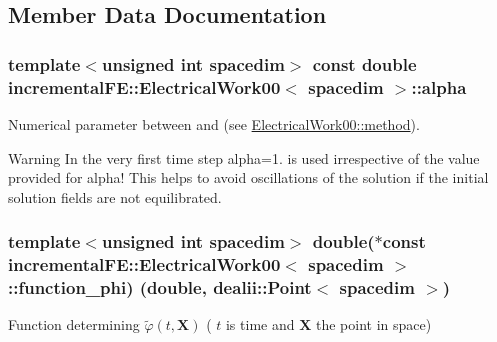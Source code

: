 \subsection{Member Data Documentation}
\subsubsection[{\texorpdfstring{alpha}{alpha}}]{\setlength{\rightskip}{0pt plus 5cm}template$<$unsigned int spacedim$>$ const double {\bf incremental\+F\+E\+::\+Electrical\+Work00}$<$ spacedim $>$\+::alpha\hspace{0.3cm}{\ttfamily [private]}}\hypertarget{classincremental_f_e_1_1_electrical_work00_a932398e0ec8ba1599cbb6cb1cdb0bdbc}{}\label{classincremental_f_e_1_1_electrical_work00_a932398e0ec8ba1599cbb6cb1cdb0bdbc}
Numerical parameter between {} and {} (see \hyperlink{classincremental_f_e_1_1_electrical_work00_a6730746f75d7d3ebae632da3e7fd68d5}{Electrical\+Work00\+::method}).

\begin{DoxyWarning}{Warning}
In the very first time step {\ttfamily alpha=1.} is used irrespective of the value provided for {\ttfamily alpha!} This helps to avoid oscillations of the solution if the initial solution fields are not equilibrated. 
\end{DoxyWarning}
\subsubsection[{\texorpdfstring{function\+\_\+phi}{function_phi}}]{\setlength{\rightskip}{0pt plus 5cm}template$<$unsigned int spacedim$>$ double($\ast$const {\bf incremental\+F\+E\+::\+Electrical\+Work00}$<$ spacedim $>$\+::function\+\_\+phi) (double, dealii\+::\+Point$<$ spacedim $>$)\hspace{0.3cm}{\ttfamily [private]}}\hypertarget{classincremental_f_e_1_1_electrical_work00_aa529e919f57a2cb3c6a6d63014431b9c}{}\label{classincremental_f_e_1_1_electrical_work00_aa529e919f57a2cb3c6a6d63014431b9c}
Function determining $\tilde\varphi(t, \boldsymbol{X})$ ( $t$ is time and $\boldsymbol{X}$ the point in space) 
